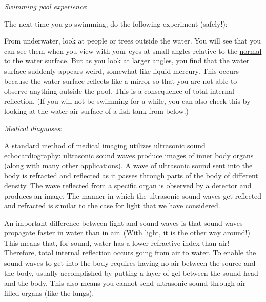 \emph{Swimming pool experience}:\vspace{0.6\baselineskip}

The next time you go swimming, do the following experiment (safely!):\myskip

From underwater, look at people or trees outside the water. You will see that you can see them when you view with your eyes at small angles relative to the \underline{normal} to the water surface. But as you look at larger angles, you find that the water surface suddenly appears weird, somewhat like liquid mercury. This occurs because the water surface reflects like a mirror so that you are not able to observe anything outside the pool. This is a consequence of total internal reflection. (If you will not be swimming for a while, you can also check this by looking at the water-air surface of a fish tank from below.)\vspace{0.6\baselineskip}

\noindent\emph{Medical diagnoses}:\vspace{0.6\baselineskip}

A standard method of medical imaging utilizes ultrasonic sound echocardiography: ultrasonic sound waves produce images of inner body organs (along with many other applications). A wave of ultrasonic sound sent into the body is refracted and reflected as it passes through parts of the body of different density. The wave reflected from a specific organ is observed by a detector and produces an image. The manner in which the ultrasonic sound waves get reflected and refracted is similar to the case for light that we have considered.\myskip

An important difference between light and sound waves is that sound waves propagate faster in water than in air. (With light, it is the other way around!)  This means that, for sound, water has a lower refractive index than air! Therefore, total internal reflection occurs going from air to water.  To enable the sound waves to get into the body requires having no air between the source and the body, usually accomplished by putting a layer of gel between the sound head and the body. This also means you cannot send ultrasonic sound through air-filled organs (like the lungs).


